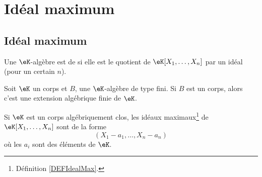\section{Idéal maximum}

\subsection{Idéal maximum}

\begin{definition}  \label{DefWHDdTrC}
	Une \( \eK\)-algèbre est de  si elle est le quotient de \( \eK[X_1,\ldots, X_n]\) par un idéal (pour un certain \( n\)).
\end{definition}

\begin{theorem}      \label{ThonoZyKa}
	Soit \( \eK\) un corps et \( B\), une \( \eK\)-algèbre de type fini. Si \( B\) est un corps, alors c'est une extension algébrique finie de \( \eK\).
\end{theorem}

\begin{theorem}  \label{ThowgZYqx}
	Si \( \eK\) est un corps algébriquement clos, les idéaux maximaux\footnote{Définition \ref{DEFIdealMax}.} de \( \eK[X_1,\ldots, X_n]\) sont de la forme
	\begin{equation}
		(X_1-a_1,\ldots, X_n-a_n)
	\end{equation}
	où les \( a_i\) sont des éléments de \( \eK\).
\end{theorem}

